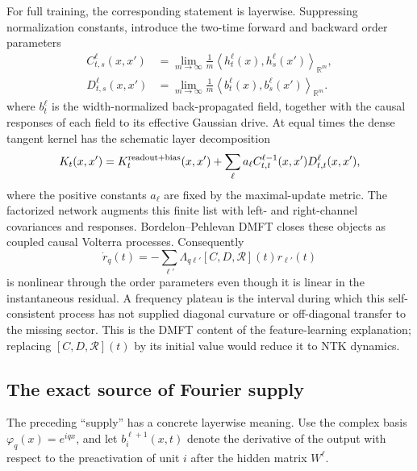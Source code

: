 \documentclass[11pt]{article}
\newcommand{\R}{\mathbb R}
\newcommand{\1}{\mathbf 1}
\newcommand{\ip}[2]{\left\langle #1,#2\right\rangle}
\theoremstyle{plain}
\theoremstyle{definition}
\begin{document}
For full training, the corresponding statement is layerwise.  Suppressing
normalization constants, introduce the two-time forward and backward order
parameters
\begin{align}
 C^\ell_{t,s}(x,x')
 &=\lim_{m\to\infty}\frac1m
 \ip{h_t^\ell(x)}{h_s^\ell(x')}_{\R^m},\nonumber\\
 D^\ell_{t,s}(x,x')
 &=\lim_{m\to\infty}\frac1m
 \ip{b_t^\ell(x)}{b_s^\ell(x')}_{\R^m}.
 \label{eq:deep-order-parameters}
\end{align}
where \(b_t^\ell\) is the width-normalized back-propagated field, together
with the causal responses of each field to its effective Gaussian drive.  At
equal times the dense tangent kernel has the schematic layer decomposition
\begin{equation}
 K_t(x,x')=K_t^{\rm readout+bias}(x,x')+
 \sum_{\ell}a_\ell
 C^{\ell-1}_{t,t}(x,x')D^\ell_{t,t}(x,x'),
 \label{eq:deep-kernel-order-parameters}
\end{equation}
where the positive constants \(a_\ell\) are fixed by the maximal-update
metric.  The factorized network augments this finite list with left- and
right-channel covariances and responses.  Bordelon--Pehlevan DMFT closes
these objects as coupled causal Volterra processes.  Consequently
\begin{equation}
 \dot r_q(t)=-\sum_{\ell'}
 \Lambda_{q\ell'}[C,D,\mathcal R](t)r_{\ell'}(t)
 \label{eq:deep-dmft-fourier}
\end{equation}
is nonlinear through the order parameters even though it is linear in the
instantaneous residual.  A frequency plateau is the interval during which
this self-consistent process has not supplied diagonal curvature or
off-diagonal transfer to the missing sector.  This is the DMFT content of
the feature-learning explanation; replacing \([C,D,\mathcal R](t)\) by its initial
value would reduce it to NTK dynamics.

\subsection{The exact source of Fourier supply}

The preceding ``supply'' has a concrete layerwise meaning.  Use the complex
basis \(\varphi_q(x)=e^{iqx}\), and let \(b_i^{\ell+1}(x,t)\) denote the
derivative of the output with respect to the preactivation of unit \(i\)
after the hidden matrix \(W^\ell\).
\end{document}
